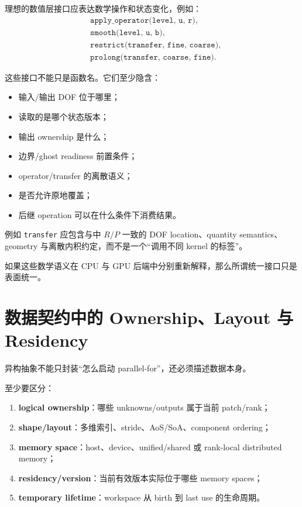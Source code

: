 理想的数值层接口应表达数学操作和状态变化，例如：
\begin{align}
&\texttt{apply\_operator(level, u, r)},\\
&\texttt{smooth(level, u, b)},\\
&\texttt{restrict(transfer, fine, coarse)},\\
&\texttt{prolong(transfer, coarse, fine)}.
\end{align}

这些接口不能只是函数名。它们至少隐含：

\begin{itemize}
\item 输入/输出 DOF 位于哪里；
\item 读取的是哪个状态版本；
\item 输出 ownership 是什么；
\item 边界/ghost readiness 前置条件；
\item operator/transfer 的离散语义；
\item 是否允许原地覆盖；
\item 后继 operation 可以在什么条件下消费结果。
\end{itemize}

例如 \texttt{transfer} 应包含与中 $R/P$ 一致的 DOF location、quantity semantics、geometry 与离散内积约定，而不是一个“调用不同 kernel 的标签”。

如果这些数学语义在 CPU 与 GPU 后端中分别重新解释，那么所谓统一接口只是表面统一。

\section{数据契约中的 Ownership、Layout 与 Residency}

异构抽象不能只封装“怎么启动 parallel-for”，还必须描述数据本身。

至少要区分：

\begin{enumerate}
\item \textbf{logical ownership}：哪些 unknowns/outputs 属于当前 patch/rank；
\item \textbf{shape/layout}：多维索引、stride、AoS/SoA、component ordering；
\item \textbf{memory space}：host、device、unified/shared 或 rank-local distributed memory；
\item \textbf{residency/version}：当前有效版本实际位于哪些 memory spaces；
\item \textbf{temporary lifetime}：workspace 从 birth 到 last use 的生命周期。
\end{enumerate}

